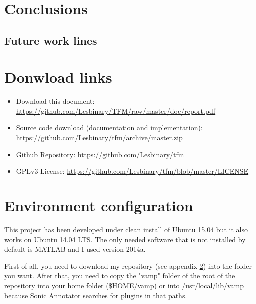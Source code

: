 \documentclass[a4paper,openany,oneside,12pt]{book}
\begin{document}
\chapter{Conclusions}\label{conclusions}


\section{Future work lines}







\nocite{*}
\cleardoublepage
{}








\appendix
\chapter{Donwload links}\label{links}
\begin{itemize}

\item Download this document: \url{https://github.com/Lesbinary/TFM/raw/master/doc/report.pdf}

\item Source code download (documentation and implementation): \url{https://github.com/Lesbinary/tfm/archive/master.zip}

\item Github Repository: \url{https://github.com/Lesbinary/tfm}

\item GPLv3 License: \url{https://github.com/Lesbinary/tfm/blob/master/LICENSE}

\end{itemize}


\chapter{Environment configuration}\label{configuration}

This project has been developed under clean install of Ubuntu 15.04 but it also works on Ubuntu 14.04 LTS. The only needed software that is not installed by default is MATLAB and I used version 2014a.

First of all, you need to download my repository (see appendix \ref{links}) into the folder you want. After that, you need to copy the "vamp" folder of the root of the repository into your home folder (\$HOME/vamp) or into /usr/local/lib/vamp because Sonic Annotator searches for plugins in that paths.
\end{document}
